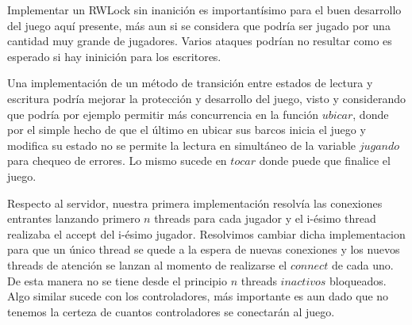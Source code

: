 Implementar un RWLock sin inanición es importantísimo para el buen desarrollo del juego aquí presente, más aun si se considera que podría ser jugado por una cantidad muy grande de jugadores. Varios ataques podrían no resultar como es esperado si hay ininición para los escritores.

Una implementación de un método de transición entre estados de lectura y escritura podría mejorar la protección y desarrollo del juego, visto y considerando que podría por ejemplo permitir más concurrencia en la función $ubicar$, donde por el simple hecho de que el último en ubicar sus barcos inicia el juego y modifica su estado no se permite la lectura en simultáneo de la variable $jugando$ para chequeo de errores. Lo mismo sucede en $tocar$ donde puede que finalice el juego.

Respecto al servidor, nuestra primera implementación resolvía las conexiones entrantes lanzando primero $n$ threads para cada jugador y el i-ésimo thread realizaba el accept del i-ésimo jugador. Resolvimos cambiar dicha implementacion para que un único thread se quede a la espera de nuevas conexiones y los nuevos threads de atención se lanzan al momento de realizarse el $connect$ de cada uno. De esta manera no se tiene desde el principio $n$ threads $inactivos$ bloqueados. Algo similar sucede con los controladores, más importante es aun dado que no tenemos la certeza de cuantos controladores se conectarán al juego.
